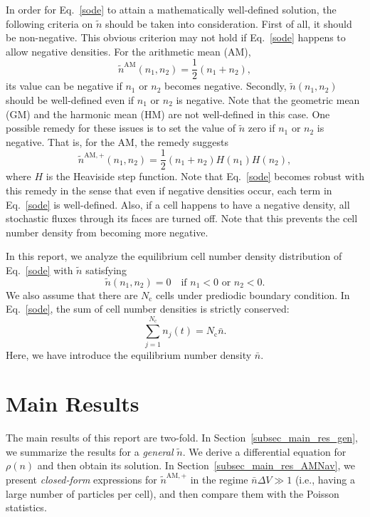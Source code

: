 \documentclass{article}
\newcommand{\dV}{{\Delta V}}
\newcommand{\Nc}{{N_\mathrm{c}}}
\newcommand{\nb}{\bar{n}}
\begin{document}
In order for Eq.~\eqref{sode} to attain a mathematically well-defined solution, the following criteria on $\tilde{n}$ should be taken into consideration.
First of all, it should be non-negative.
This obvious criterion may not hold if Eq.~\eqref{sode} happens to allow negative densities.
For the arithmetic mean (AM),
\begin{equation}
\tilde{n}^\mathrm{AM}(n_1,n_2)=\frac12(n_1+n_2),
\end{equation}
its value can be negative if $n_1$ or $n_2$ becomes negative.
Secondly, $\tilde{n}(n_1,n_2)$ should be well-defined even if $n_1$ or $n_2$ is negative.
Note that the geometric mean (GM) and the harmonic mean (HM) are not well-defined in this case.
One possible remedy for these issues is to set the value of $\tilde{n}$ zero if $n_1$ or $n_2$ is negative.
That is, for the AM, the remedy suggests
\begin{equation}
\label{tildenAMP}
\tilde{n}^\mathrm{AM,+}(n_1,n_2)=\frac12(n_1+n_2)H(n_1)H(n_2),
\end{equation}
where $H$ is the Heaviside step function.
Note that Eq.~\eqref{sode} becomes robust with this remedy in the sense that even if negative densities occur, each term in Eq.~\eqref{sode} is well-defined.
Also, if a cell happens to have a negative density, all stochastic fluxes through its faces are turned off.
Note that this prevents the cell number density from becoming more negative.

In this report, we analyze the equilibrium cell number density distribution of Eq.~\eqref{sode} with $\tilde{n}$ satisfying
\begin{equation}
\label{cond}
\tilde{n}(n_1,n_2) = 0\quad\mbox{if $n_1<0$ or $n_2<0$}.
\end{equation}
We also assume that there are $\Nc$ cells under prediodic boundary condition.
In Eq.~\eqref{sode}, the sum of cell number densities is strictly conserved:
\begin{equation}
\sum_{j=1}^\Nc n_j(t)=\Nc\nb.
\end{equation}
Here, we have introduce the equilibrium number density $\nb$.

\section{\label{sec_main_res}Main Results}

The main results of this report are two-fold.
In Section~\ref{subsec_main_res_gen}, we summarize the results for a \textit{general} $\tilde{n}$.
We derive a differential equation for $\rho(n)$ and then obtain its solution.
In Section~\ref{subsec_main_res_AMNav}, we present \textit{closed-form} expressions for $\tilde{n}^{\mathrm{AM},+}$ in the regime $\nb\dV\gg 1$ (i.e., having a large number of particles per cell), and then compare them with the Poisson statistics.
\end{document}
